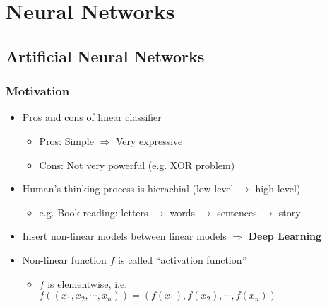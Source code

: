 \section{Neural Networks}

\subsection{Artificial Neural Networks}

\subsubsection*{Motivation}
\begin{itemize}
    \item Pros and cons of linear classifier
    \begin{itemize}
        \item Pros: Simple $\Rightarrow$ Very expressive
        \item Cons: Not very powerful (e.g. XOR problem)
    \end{itemize}
    \item Human's thinking process is hierachial (low level $\rightarrow$ high level)
    \begin{itemize}
        \item e.g. Book reading: letters $\rightarrow$ words $\rightarrow$ sentences $\rightarrow$ story
    \end{itemize}
    \item Insert non-linear models between linear models $\Rightarrow$ \textbf{Deep Learning}
    \item Non-linear function $f$ is called ``activation function''
    \begin{itemize}
        \item $f$ is elementwise, i.e. $f\left((x_1,x_2,\cdots,x_n)\right)=(f(x_1),f(x_2),\cdots,f(x_n))$
    \end{itemize}
\end{itemize}
\begin{figures}
\end{figures}

